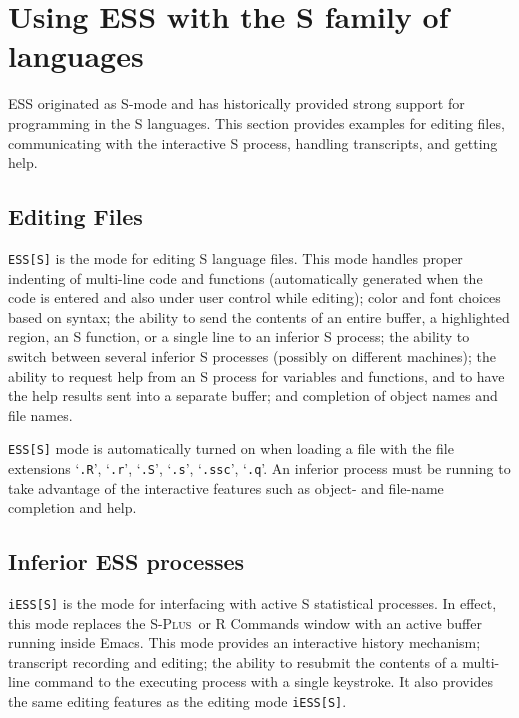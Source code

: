 \documentclass{article}
\newcommand*{\Splus}{\textsc{S-Plus}}
\newcommand{\stexttt}[1]{{\small\texttt{#1}}}
\newcommand{\file}[1]{`\stexttt{#1}'}
\begin{document}
\section{Using ESS with the S family of languages}
\label{sec:S}

ESS originated as S-mode and has historically provided strong support for
programming in the S languages.  This section provides examples for
editing files, communicating with the interactive S process, handling
transcripts, and getting help.

\subsection{Editing Files}
\label{sec:S:edit}

\stexttt{ESS[S]} is the mode for editing S language files.  This mode
handles proper indenting of multi-line code and functions
(automatically generated when the code is entered and also under user
control while editing); color and font choices based on syntax; the
ability to send the contents of an entire buffer, a highlighted
region, an S function, or a single line to an inferior S process; the
ability to switch between several inferior S processes (possibly on
different machines); the ability to request help from an S process for
variables and functions, and to have the help results sent into a
separate buffer; and completion of object names and file names.

\stexttt{ESS[S]} mode is automatically turned on when loading a file with the
file extensions \file{.R}, \file{.r},
\file{.S}, \file{.s}, \file{.ssc}, \file{.q}.  An inferior
process must be running to take advantage of the interactive features
such as object- and file-name completion and help.

\subsection{Inferior ESS processes}
\label{sec:S:inf}

\stexttt{iESS[S]} is the mode for interfacing with active S
statistical processes.  In effect, this mode replaces the \Splus\ or R
Commands window with an active buffer running inside Emacs.  This mode
provides an interactive history mechanism; transcript recording and
editing; the ability to resubmit the contents of a multi-line command
to the executing process with a single keystroke.  It also provides
the same editing features as the editing mode \stexttt{iESS[S]}.
\end{document}
